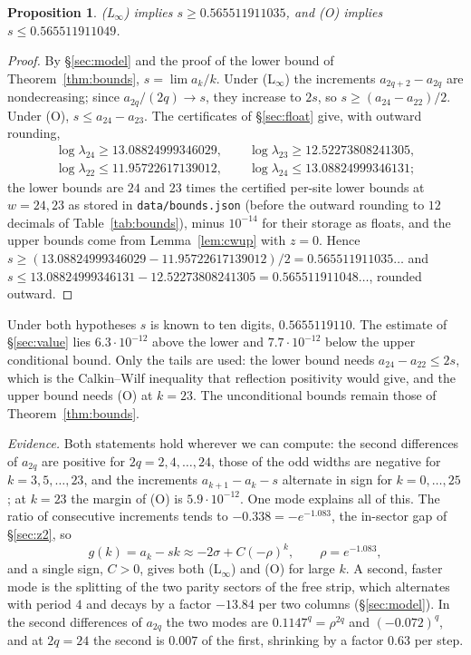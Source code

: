 \documentclass[11pt]{amsart}
\newtheorem{proposition}[theorem]{Proposition}
\theoremstyle{definition}
\theoremstyle{remark}
\newcommand{\file}[1]{\texttt{#1}}
\begin{document}
\begin{proposition}\label{prop:cond}
(L$_\infty$) implies $s \ge 0.565511911035$, and (O) implies $s \le 0.565511911049$.
\end{proposition}
\begin{proof}
By \S\ref{sec:model} and the proof of the lower bound of Theorem~\ref{thm:bounds},
$s = \lim a_k/k$. Under
(L$_\infty$) the increments $a_{2q+2} - a_{2q}$ are nondecreasing; since $a_{2q}/(2q) \to s$, they
increase to $2s$, so $s \ge (a_{24} - a_{22})/2$. Under (O), $s \le a_{24} - a_{23}$. The certificates
of \S\ref{sec:float} give, with outward rounding,
\begin{gather*}
  \log\lambda_{24} \ge 13.08824999346029, \qquad \log\lambda_{23} \ge 12.52273808241305,\\
  \log\lambda_{22} \le 11.95722617139012, \qquad \log\lambda_{24} \le 13.08824999346131;
\end{gather*}
the lower bounds are $24$ and $23$ times the certified per-site lower bounds at $w = 24, 23$ as
stored in \file{data/bounds.json} (before the outward rounding to $12$ decimals of
Table~\ref{tab:bounds}), minus $10^{-14}$ for their storage as floats, and the upper bounds come from Lemma~\ref{lem:cwup} with
$z = 0$. Hence $s \ge (13.08824999346029 - 11.95722617139012)/2 = 0.565511911035\ldots$ and
$s \le 13.08824999346131 - 12.52273808241305 = 0.565511911048\ldots$, rounded outward.
\end{proof}

Under both hypotheses $s$ is known to ten digits, $0.5655119110$. The estimate of
\S\ref{sec:value} lies $6.3\cdot10^{-12}$ above the lower and $7.7\cdot10^{-12}$ below the upper
conditional bound. Only the tails are used: the lower bound needs $a_{24} - a_{22} \le 2s$, which is
the Calkin--Wilf inequality that reflection positivity would give, and the upper bound needs (O)
at $k = 23$. The unconditional bounds remain those of Theorem~\ref{thm:bounds}.

\emph{Evidence.} Both statements hold wherever we can compute: the second differences of
$a_{2q}$ are positive for $2q = 2, 4, \dots, 24$, those of the odd widths are negative for
$k = 3, 5, \dots, 23$, and the increments $a_{k+1} - a_k - s$ alternate in sign for
$k = 0, \dots, 25$; at $k = 23$ the margin of (O) is $5.9\cdot10^{-12}$. One mode explains all of
this. The ratio of consecutive increments tends to $-0.338 = -e^{-1.083}$, the in-sector gap of
\S\ref{sec:z2}, so
\[
  g(k) = a_k - sk \approx -2\sigma + C(-\rho)^k, \qquad \rho = e^{-1.083},
\]
and a single sign, $C > 0$, gives both (L$_\infty$) and (O) for large $k$. A second, faster mode is
the splitting of the two parity sectors of the free strip, which alternates with period $4$ and
decays by a factor $-13.84$ per two columns (\S\ref{sec:model}). In the second differences of
$a_{2q}$ the two modes are $0.1147^q = \rho^{2q}$ and $(-0.072)^q$, and at $2q = 24$ the second is
$0.007$ of the first, shrinking by a factor $0.63$ per step.
\end{document}
